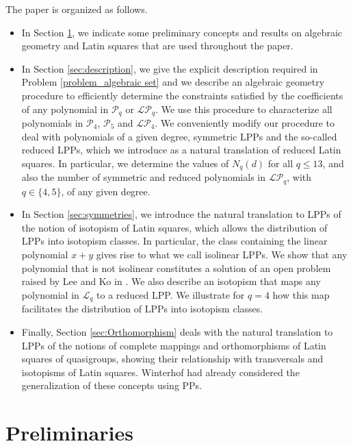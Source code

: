 \documentclass[pdflatex,sn-mathphys-num]{sn-jnl}
\theoremstyle{thmstyleone}%
\begin{document}
\vspace{0.2cm}

The paper is organized as follows. 
\begin{itemize}
    \item In Section \ref{sec:preliminaries}, we indicate some preliminary concepts and results on algebraic geometry and Latin squares that are used throughout the paper. 
    
    \item In Section \ref{sec:description}, we give the explicit description required in Problem \ref{problem_algebraic set} and we describe an algebraic geometry procedure to efficiently determine the constraints satisfied by the coefficients of any polynomial in $\mathcal{P}_q$ or $\mathcal{LP}_q$. We use this procedure to characterize all polynomials in $\mathcal{P}_4$, $\mathcal{P}_5$ and $\mathcal{LP}_4$. We conveniently modify our procedure to deal with polynomials of a given degree, symmetric LPPs and the so-called reduced LPPs, which we introduce as a natural translation of reduced Latin squares. In particular, we determine the values of $N_q(d)$ for all $q\leq 13$, and also the number of symmetric and reduced polynomials in $\mathcal{LP}_q$, with $q\in\{4,5\}$, of any given degree.
    
    \item In Section \ref{sec:symmetries}, we introduce the natural translation to LPPs of the notion of isotopism of Latin squares, which allows the distribution of LPPs into isotopism classes. In particular, the class containing the linear polynomial $x+y$ gives rise to what we call isolinear LPPs. We show that any polynomial that is not isolinear constitutes a solution of an open problem raised by Lee and Ko in \cite{Lee1994}. We also describe an isotopism that maps any polynomial in $\mathcal{L}_q$ to a reduced LPP. We illustrate for $q=4$ how this map facilitates the distribution of LPPs into isotopism classes.
    

    \item Finally, Section \ref{sec:Orthomorphism} deals with the natural translation to LPPs of the notions of complete mappings and orthomorphisms of Latin squares of quasigroups, showing their relationship with transversals and isotopisms of Latin squares. Winterhof  \cite{Winterhof2014} had already considered the generalization of these concepts using PPs. 
\end{itemize}

\section{Preliminaries}\label{sec:preliminaries}
\end{document}

